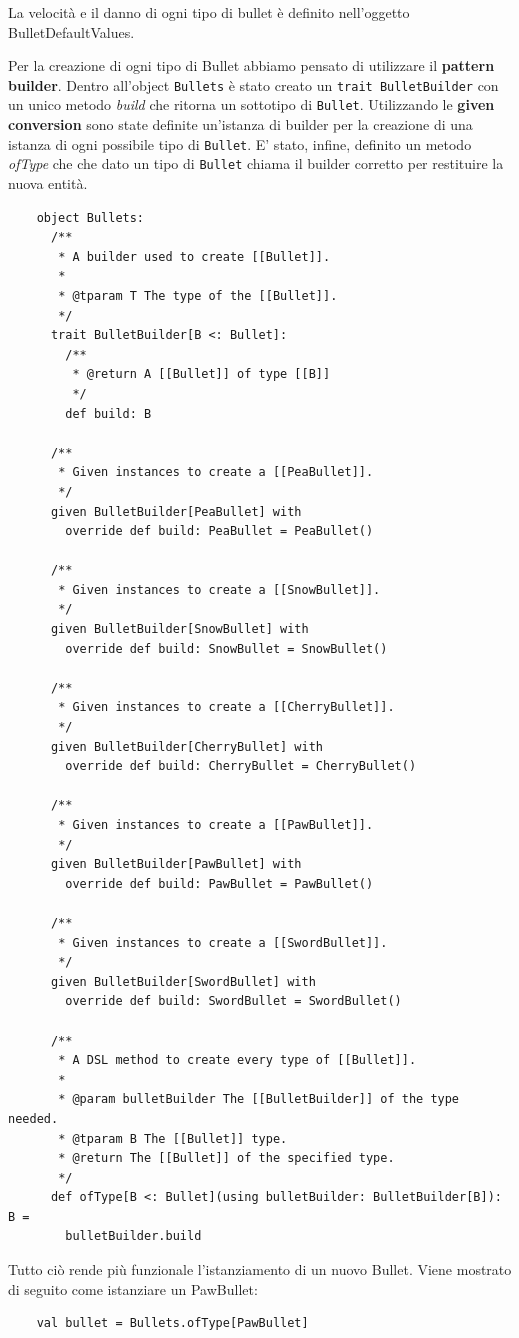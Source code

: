 La velocità e il danno di ogni tipo di bullet è definito nell'oggetto BulletDefaultValues.

Per la creazione di ogni tipo di Bullet abbiamo pensato di utilizzare il \textbf{pattern builder}.
Dentro all'object \texttt{Bullets} è stato creato un \texttt{trait BulletBuilder}
con un unico metodo \textit{build} che ritorna un sottotipo di \texttt{Bullet}.
Utilizzando le \textbf{given conversion} sono state definite un'istanza di builder per la creazione di una istanza
di ogni possibile tipo di \texttt{Bullet}.
E' stato, infine, definito un metodo \textit{ofType} che che dato un tipo
di \texttt{Bullet} chiama il builder corretto per restituire la nuova entità.
\begin{verbatim}
    object Bullets:
      /**
       * A builder used to create [[Bullet]].
       *
       * @tparam T The type of the [[Bullet]].
       */
      trait BulletBuilder[B <: Bullet]:
        /**
         * @return A [[Bullet]] of type [[B]]
         */
        def build: B

      /**
       * Given instances to create a [[PeaBullet]].
       */
      given BulletBuilder[PeaBullet] with
        override def build: PeaBullet = PeaBullet()

      /**
       * Given instances to create a [[SnowBullet]].
       */
      given BulletBuilder[SnowBullet] with
        override def build: SnowBullet = SnowBullet()

      /**
       * Given instances to create a [[CherryBullet]].
       */
      given BulletBuilder[CherryBullet] with
        override def build: CherryBullet = CherryBullet()

      /**
       * Given instances to create a [[PawBullet]].
       */
      given BulletBuilder[PawBullet] with
        override def build: PawBullet = PawBullet()

      /**
       * Given instances to create a [[SwordBullet]].
       */
      given BulletBuilder[SwordBullet] with
        override def build: SwordBullet = SwordBullet()

      /**
       * A DSL method to create every type of [[Bullet]].
       *
       * @param bulletBuilder The [[BulletBuilder]] of the type needed.
       * @tparam B The [[Bullet]] type.
       * @return The [[Bullet]] of the specified type.
       */
      def ofType[B <: Bullet](using bulletBuilder: BulletBuilder[B]): B =
        bulletBuilder.build
\end{verbatim}

Tutto ciò rende più funzionale l'istanziamento di un nuovo Bullet.
Viene mostrato di seguito come istanziare un PawBullet:
\begin{verbatim}
    val bullet = Bullets.ofType[PawBullet]
\end{verbatim}


